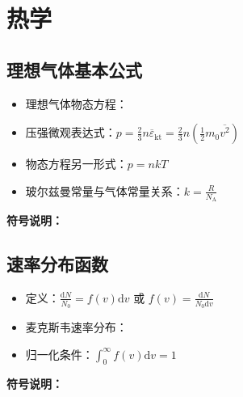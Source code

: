 \section{热学}
\subsection{理想气体基本公式}
\begin{itemize}
    \item 理想气体物态方程：
    \item 压强微观表达式：$p = \frac{2}{3} n \overline{\varepsilon}_{\text{kt}} = \frac{2}{3} n \left( \frac{1}{2} m_0 \overline{v^2} \right)$
    \item 物态方程另一形式：$p = nkT$
    \item 玻尔兹曼常量与气体常量关系：$k=\frac{R}{N_{\text{A}}}$
\end{itemize}

\textbf{符号说明：}\\

\subsection{速率分布函数}
\begin{itemize}
    \item 定义：$\frac{\mathrm{d}N}{N_0} = f(v)\mathrm{d}v$ 或 $f(v) = \frac{\mathrm{d}N}{N_0 \mathrm{d}v}$
    \item 麦克斯韦速率分布：
    \item 归一化条件：$\int_{0}^{\infty} f(v) \mathrm{d}v = 1$
\end{itemize}

\textbf{符号说明：}\\

